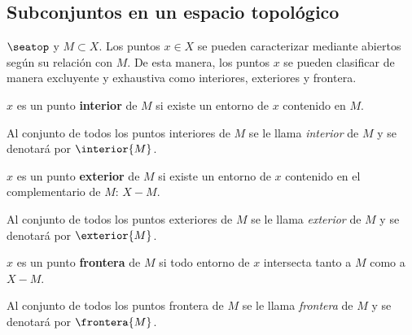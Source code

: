 \subsection*{Subconjuntos en un espacio topológico}

$\seatop$ y $M\subset X$. Los puntos $x\in X$ se pueden caracterizar mediante abiertos según su relación con $M$. De esta manera, los puntos $x$ se pueden clasificar de manera excluyente y exhaustiva como interiores, exteriores y frontera.

\begin{deff}
    $x$ es un punto \textbf{interior} de $M$ si existe un entorno de $x$ contenido en $M$.
\end{deff}
Al conjunto de todos los puntos interiores de $M$ se le llama \textit{interior} de $M$ y se denotará por \underline{$\interior{M}$}.

\begin{deff}
    $x$ es un punto \textbf{exterior} de $M$ si existe un entorno de $x$ contenido en el complementario de $M$: $X - M$.
\end{deff}
Al conjunto de todos los puntos exteriores de $M$ se le llama \textit{exterior} de $M$ y se denotará por \underline{$\exterior{M}$}.

\begin{deff}
    $x$ es un punto \textbf{frontera} de $M$ si todo entorno de $x$ intersecta tanto a $M$ como a $X - M$.
\end{deff}
Al conjunto de todos los puntos frontera de $M$ se le llama \textit{frontera} de $M$ y se denotará por \underline{$\frontera{M}$}.

